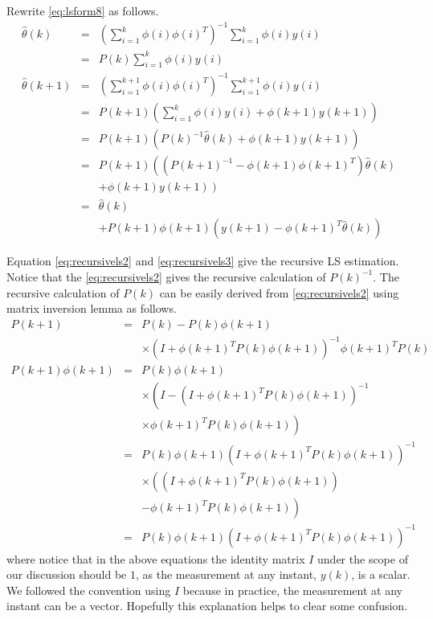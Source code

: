 Rewrite \eqref{eq:lsform8} as follows.
\begin{eqnarray}
  \hat{\theta}(k) &=& \left(\sum_{i=1}^{k} \phi(i)\phi(i)^T\right)^{-1}\sum_{i=1}^{k}\phi(i)y(i) \nonumber \\
                  &=& P(k)\sum_{i=1}^{k}\phi(i)y(i) \nonumber \\
  \hat{\theta}(k+1) &=& \left(\sum_{i=1}^{k+1} \phi(i)\phi(i)^T\right)^{-1}\sum_{i=1}^{k+1}\phi(i)y(i) \nonumber \\
                    &=& P(k+1)\left(\sum_{i=1}^{k}\phi(i)y(i) + \phi(k+1)y(k+1)\right) \nonumber \\
                    &=& P(k+1)\left(P(k)^{-1}\hat{\theta}(k) + \phi(k+1)y(k+1)\right) \nonumber \\
                    &=& P(k+1)\left(\left(P(k+1)^{-1} - \phi(k+1)\phi(k+1)^T\right)\hat{\theta}(k) \right. \nonumber \\
                     && \left. + \phi(k+1)y(k+1)\right) \nonumber \\
                    &=& \hat{\theta}(k) \nonumber \\ && + P(k+1)\phi(k+1)\left(y(k+1) - \phi(k+1)^T\hat{\theta}(k)\right) \label{eq:recursivels3}
\end{eqnarray}

Equation \eqref{eq:recursivels2} and \eqref{eq:recursivels3} give the recursive LS estimation. Notice that the \eqref{eq:recursivels2} gives the recursive calculation of $P(k)^{-1}$. The recursive calculation of $P(k)$ can be easily derived from \eqref{eq:recursivels2} using matrix inversion lemma as follows.
\begin{eqnarray}
P(k+1) &=& P(k) - P(k)\phi(k+1) \nonumber \\ && \times \left(I + \phi(k+1)^TP(k)\phi(k+1)\right)^{-1}\phi(k+1)^TP(k) \nonumber \\
P(k+1)\phi(k+1) &=& P(k)\phi(k+1) \nonumber \\ && \times \left(I - \left(I + \phi(k+1)^TP(k)\phi(k+1)\right)^{-1}\right. \nonumber \\ &&  \left. \times \phi(k+1)^TP(k)\phi(k+1)\right) \nonumber \\
&=& P(k)\phi(k+1)\left(I + \phi(k+1)^TP(k)\phi(k+1)\right)^{-1} \nonumber \\ && \times \left(\left(I + \phi(k+1)^TP(k)\phi(k+1)\right) \right. \nonumber \\ && \left. - \phi(k+1)^TP(k)\phi(k+1)\right) \nonumber \\
&=& P(k)\phi(k+1)\left(I + \phi(k+1)^TP(k)\phi(k+1)\right)^{-1} \nonumber
\end{eqnarray}
where notice that in the above equations the identity matrix $I$ under the scope of our discussion should be $1$, as the measurement at any instant, $y(k)$, is a scalar. We followed the convention using $I$ because in practice, the measurement at any instant can be a vector. Hopefully this explanation helps to clear some confusion.

